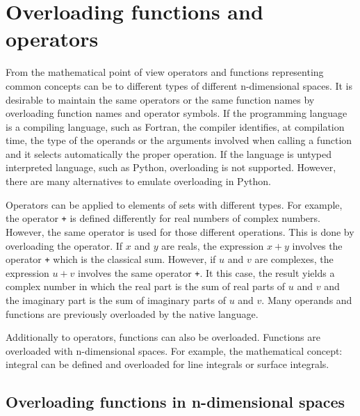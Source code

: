 
\chapter{Overloading functions and operators}    \label{ch:overloading}
From the mathematical point of view operators and functions representing 
common concepts can be to different types of different n-dimensional spaces.
It is desirable to maintain the same operators or the same function names 
by overloading function names and operator symbols. 
If the programming language is a compiling language, such as Fortran, 
the compiler identifies, at compilation time, the type of the operands or the arguments 
involved when calling a function and it selects automatically the proper operation. 
If the language is untyped interpreted language, such as Python, overloading is not supported. 
However, there are many alternatives to emulate overloading in Python. 

Operators can be applied to elements of sets with different types.
For example, the operator \texttt{+} 
is defined differently for real numbers of complex numbers. However, the same operator 
is used for those different operations. This is done by overloading the operator. 
If $x$ and $y$ are reals, the expression $ x+y $ involves the operator \texttt{+}
which is the classical sum. 
However, if  $u$ and $v$ are complexes, 
the expression $ u+v $ involves the same operator \texttt{+}. It this case, 
the result yields a complex number in which 
the real part is the sum of real parts of $ u $ and $ v $
and the imaginary part is the sum of imaginary parts of $ u $ and $ v $.
Many operands and functions are previously overloaded by the native language.

Additionally to operators, functions can also be overloaded. 
Functions are overloaded with n-dimensional spaces. 
For example, the mathematical concept: integral 
can be defined and overloaded for line integrals or surface integrals. 
 

\newpage 
\section{Overloading functions in n-dimensional spaces}

